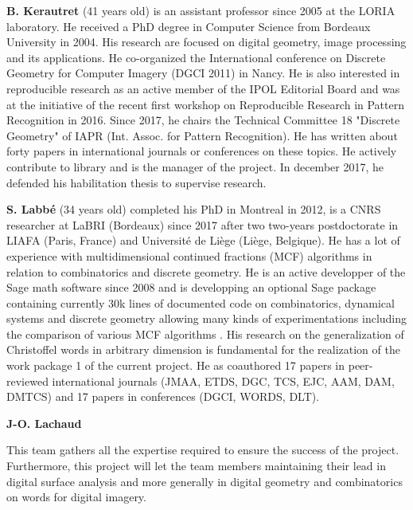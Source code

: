   
 \textbf{B. Kerautret} (41 years old) is an assistant professor since 2005
 at the LORIA laboratory. He received a PhD degree in Computer
 Science from Bordeaux University in 2004.  His research are
 focused on digital geometry, image processing and its applications.
 He co-organized the International conference on Discrete
 Geometry for Computer Imagery (DGCI 2011) in Nancy. He
 is also interested in reproducible research as an active member of the
 IPOL Editorial Board and was at the initiative of the recent
 first workshop on Reproducible Research in Pattern Recognition in
 2016.
 Since 2017, he chairs the Technical Committee 18 "Discrete Geometry" of IAPR
 (Int. Assoc. for Pattern Recognition). He has written
 about forty papers in international journals or conferences on these
 topics. He actively contribute to {\DGtal} library and is the manager of
 the {\DGtalTools} project.
 In december 2017, he defended his habilitation thesis to supervise research.
 

\textbf{S. Labb\'{e}} (34 years old) completed his PhD in Montreal in 2012, is
a CNRS researcher at LaBRI (Bordeaux) since 2017 after two two-years
postdoctorate in LIAFA (Paris, France) and Université de Liège (Liège,
Belgique).  He has a lot of experience with multidimensional continued
fractions (MCF) algorithms \cite{arnoux_labbe_2017,cassaigne_a_set_2017} in
relation to combinatorics and discrete geometry.  He is an active developper of
the Sage math software since 2008 and is developping an optional Sage package
containing currently 30k lines of documented code \cite{labbe_slabbe_0_4_2018}
on combinatorics, dynamical systems and discrete geometry allowing many kinds
of experimentations including the comparison of various MCF algorithms
\cite{labbe_3-dimensional_2015}.  His research on the generalization of
Christoffel words in arbitrary dimension \cite{Labbe2015} is fundamental for
the realization of the work package 1 of the current project.  He as coauthored
17 papers in peer-reviewed international journals (\eg JMAA, ETDS, DGC, TCS,
EJC, AAM, DAM, DMTCS) and 17 papers in conferences (\eg DGCI, WORDS, DLT).

\textbf{J-O. Lachaud}


This team gathers all the expertise required to ensure the success of the project.
Furthermore, this project will let the team members maintaining their lead in digital surface analysis 
and more generally in digital geometry and combinatorics on words for digital imagery. 


